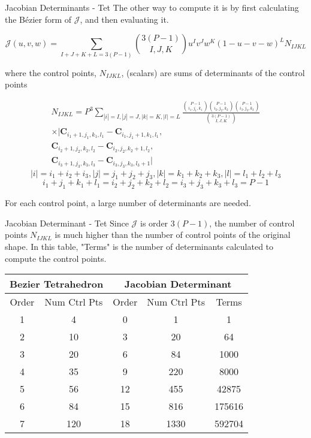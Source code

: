 \documentclass[12pt]{beamer}
\begin{document}
\begin{frame}{Jacobian Determinants - Tet}
The other way to compute it is by first calculating the B{\'e}zier form of $\mathcal{J}$, and then evaluating it. 
{
  \footnotesize

\[ \mathcal{J}(u,v,w) = \displaystyle\sum_{I+J+K+L=3(P-1)}  {3(P-1) \choose I,J,K}u^Iv^Jw^K(1-u-v-w)^LN_{IJKL}  \]
}where the control points, $N_{IJKL}$, (scalars) are sums of determinants of the control points
{
  \scriptsize
\begin{eqnarray*}
N_{IJKL} = P^3 \displaystyle\sum_{|i|=I,|j|=J,|k|=K,|l|=L} \frac{{P-1 \choose i_1,j_1,k_1}{P-1 \choose i_2,j_2,k_2}{P-1 \choose i_3,j_3,k_3}}{ {3(P-1) \choose I,J,K}} \\  \times|\mathbf{C}_{i_1+1,j_1,k_1,l_1}-\mathbf{C}_{i_1,j_1+1,k_1,l_1},\\\mathbf{C}_{i_2+1,j_2,k_2,l_2}-\mathbf{C}_{i_2,j_2,k_2+1,l_2},\\
\mathbf{C}_{i_3+1,j_3,k_3,l_3}-\mathbf{C}_{i_3,j_3,k_3,l_3+1}|
\end{eqnarray*}
\[|i| = i_1+i_2+i_3, |j| = j_1+j_2+j_3, |k| = k_1+k_2+k_3, |l| = l_1+l_2+l_3 \]
\[ i_1+j_1+k_1+l_1 = i_2+j_2+k_2+l_2 = i_3+j_3+k_3+l_3 =P-1\]

}
For each control point, a large number of determinants are needed.
\end{frame}
\begin{frame}{Jacobian Determinant - Tet}
Since $\mathcal{J}$ is order $3(P-1)$, the number of control points $N_{IJKL}$ is much higher than the number of control points of the original shape. In this table, "Terms" is the number of determinants calculated to compute the control points.

\begin{tabular}{|cc|ccc|}
\hline \multicolumn{2}{|c|}{Bezier Tetrahedron} & \multicolumn{3}{|c|}{Jacobian Determinant} \\ \hline
Order & Num Ctrl Pts & Order & Num Ctrl Pts & Terms \\ 
\hline 1 & 4 & 0 & 1 & 1 \\
2 & 10 & 3 & 20 & 64 \\
3 & 20 & 6 & 84 & 1000 \\
4 & 35 & 9 & 220 & 8000 \\
5 & 56 & 12 & 455 & 42875 \\
6 & 84 & 15 & 816 & 175616 \\
7 & 120 & 18 & 1330 & 592704 \\ \hline
\end{tabular}
\end{frame}
\end{document}
